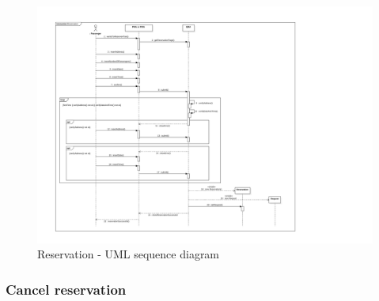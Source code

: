 \clearpage{}

\begin{landscape}

\begin{figure}[H]
\begin{centering}
\includegraphics[bb=30bp 15bp 642bp 575bp,scale=0.7]{specific-requirements/3.4-use-cases/image/reservation}
\par\end{centering}

\protect\caption{Reservation - UML sequence diagram}
\end{figure}


\end{landscape}

\clearpage{}


\subsubsection{Cancel reservation}

